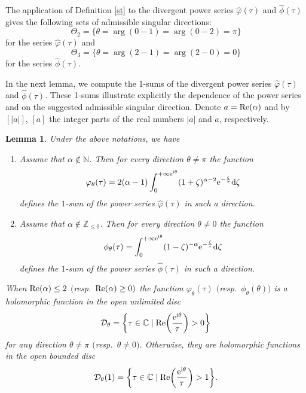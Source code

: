 \documentclass[10pt,a4paper]{amsart}
\numberwithin{equation}{section}
\newtheorem{Lemma}[Theorem]{Lemma}
\begin{document}
 The application of Definition \ref{st} to the divergent power series $\hat{\varphi}(\tau)$ and $\hat{\phi}(\tau)$ gives
 the following sets of admissible singular directions:
 \[
 \Theta_2=\{ \theta=\arg (0-1)=\arg (0-2)=\pi \}
 \]
 for the series $\hat{\varphi}(\tau)$ and
 \[
 \Theta_3=\{ \theta=\arg (2-1)=\arg (2-0)=0 \}
 \]
 for the series $\hat{\phi}(\tau)$.

 In the next lemma, we compute the 1-sums of the divergent power series $\hat{\varphi}(\tau)$ and
 $\hat{\phi}(\tau)$. These 1-sums illustrate explicitly the dependence of the power series \smash{$\hat{\varphi}(\tau)$} and
 \smash{$\hat{\phi}(\tau)$} on the suggested admissible singular direction.
 Denote $a={\rm Re} (\alpha)$ and by $[|a|]$, $[a]$ the integer parts of the real numbers $|a|$ and $a$, respectively.
 \begin{Lemma}\label{sum}
 Under the above notations, we have
 \begin{enumerate} 	\itemsep=0pt
 \item[$1.$]
 	Assume that $\alpha\notin\mathbb{N}$. Then for every direction $\theta \neq \pi$ the function
 	 \[
 	 \varphi_{\theta}(\tau)=2 (\alpha-1)
 	 \int_0^{+\infty {\rm e}^{{\rm i} \theta}}
 	 (1+\zeta)^{\alpha-2} {\rm e}^{-\frac{\zeta}{\tau}} {\rm d} \zeta
 	 \]
 	 defines the $1$-sum of the power series $\hat{\varphi}(\tau)$ in such a direction.
 	

 \item[$2.$]
 Assume that $\alpha\notin\mathbb{Z}_{\leq 0}$. Then for every direction $\theta \neq 0$ the function
 \[
 \phi_{\theta}(\tau)=\int_0^{+\infty {\rm e}^{{\rm i} \theta}}
 (1-\zeta)^{-\alpha} {\rm e}^{-\frac{\zeta}{\tau}} {\rm d} \zeta
 \]
 defines the $1$-sum of the power series $\hat{\phi}(\tau)$ in such a direction.

 \end{enumerate}

 When ${\rm Re} (\alpha) \leq 2$ $($resp.\ ${\rm Re} (\alpha) \geq 0)$ the function $\varphi_{\theta}(\tau)$
 $($resp.\ $\phi_{\theta}(\theta))$ is a holomorphic function in the open unlimited disc
 \[
 \mathcal{D}_{\theta}=\biggl\{ \tau\in\mathbb{C} \mid {\rm Re} \biggl(\frac{{\rm e}^{{\rm i} \theta}}{\tau}\biggr) > 0 \biggr\}
 \]
 for any direction $\theta \neq \pi$ $($resp.\ $\theta\neq 0)$.
 Otherwise, they are holomorphic functions in the open bounded disc
 \[
 \mathcal{D}_{\theta}(1)=\biggl\{ \tau\in\mathbb{C} \mid {\rm Re} \biggl(\frac{{\rm e}^{{\rm i} \theta}}{\tau}\biggr) > 1 \biggr\} .
 \]
 \end{Lemma}
\end{document}
